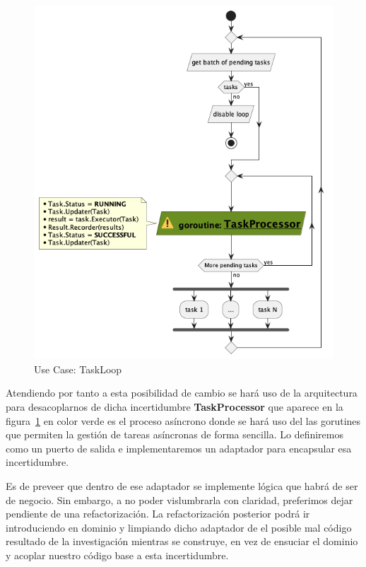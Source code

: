 \begin{figure}[H]
    \centering
    \includegraphics[height=0.4\textheight]{./part/Proyecto_ejecutivo/memoria_descriptiva/descripcionDelProyecto/manager/uml/executeTaskLoop}
    \caption{Use Case: TaskLoop}\label{fig:Use Case-TaskLoop}
\end{figure}

Atendiendo por tanto a esta posibilidad de cambio se hará uso de la arquitectura para desacoplarnos de dicha incertidumbre \textbf{TaskProcessor} que aparece en la figura~\cref{fig:Use Case-TaskLoop} en color verde es el proceso asíncrono donde se hará uso del las gorutines que permiten la gestión de tareas asíncronas de forma sencilla. Lo definiremos como un puerto de salida e implementaremos un adaptador para encapsular esa incertidumbre.

Es de preveer que dentro de ese adaptador se implemente lógica que habrá de ser de negocio. Sin embargo, a no poder vislumbrarla con claridad, preferimos dejar pendiente de una refactorización. La refactorización posterior podrá ir introduciendo en dominio y limpiando dicho adaptador de el posible mal código resultado de la investigación mientras se construye, en vez de ensuciar el dominio y acoplar nuestro código base a esta incertidumbre.

